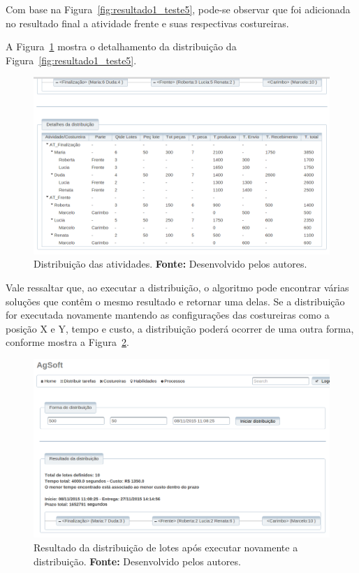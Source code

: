 \par Com base na Figura~\ref{fig:resultado1_teste5}, pode-se observar que foi
adicionada no resultado final a atividade frente e suas respectivas costureiras.

\par A Figura~\ref{fig:detalhamento1_teste5} mostra o detalhamento da
distribuição da Figura~\ref{fig:resultado1_teste5}.


\begin{figure}[h!]
	\centerline{\includegraphics[width=14.7cm]{./imagens/detalhamento1_teste5.png}}
	\caption[Distribuição das atividades.]
	{Distribuição das atividades. \textbf{Fonte:} Desenvolvido pelos
	autores.}
	\label{fig:detalhamento1_teste5}
\end{figure}

\par Vale ressaltar que, ao executar a distribuição, o algoritmo pode
encontrar várias soluções que contêm o mesmo resultado e retornar uma delas. Se
a distribuição for executada novamente mantendo as configurações das costureiras
como a posição X e Y, tempo e custo, a distribuição poderá ocorrer de uma outra
forma, conforme mostra a Figura~\ref{fig:resultado2_teste5}.



\begin{figure}[h!]
	\centerline{\includegraphics[width=14.7cm]{./imagens/resultado2_teste5.png}}
	\caption[Resultado da distribuição de lotes após executar novamente a
	distribuição.]
	{Resultado da distribuição de lotes após executar novamente a
	distribuição. \textbf{Fonte:} Desenvolvido pelos autores.}
	\label{fig:resultado2_teste5}
\end{figure}


